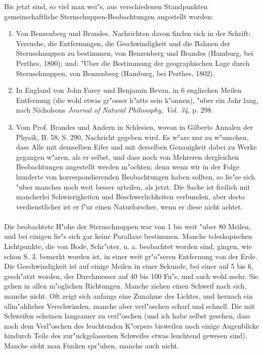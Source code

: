 \documentclass[a4paper, 11pt, oneside, polutonikogreek, german]{article}
\begin{document}
Bis jetzt sind, so viel man wei"s, aus verschiedenen Standpunkten gemeinschaftliche Sternschuppen-Beobachtungen angestellt worden:
\begin{enumerate}
    \item Von Benzenberg und Brandes. Nachrichten davon finden sich in der Schrift: Versuche, die Entfernungen, die Geschwindigkeit und die Bahnen der Sternschnuppen zu bestimmen, von Benzenberg und Brandes (Hamburg, bei Perthes, 1800); und: "Uber die Bestimmung der geographischen Lage durch Sternschnuppen, von Benzenberg (Hamburg, bei Perthes, 1802).
    \item In England von John Farey und Benjamin Bevan, in 6 englischen Meilen Entfernung (die wohl etwas gr"osser h"atte sein k"onnen), "uber ein Jahr lang, nach Nicholsons \emph{Journal of Natural Philosophy, Vol. 34}, p. 298.
    \item Vom Prof. Brandes und Andern in Schlesien, wovon in Gilberts Annalen der Physik, B. 58, S. 290, Nachricht gegeben wird. Es w"are nur zu w"unschen, dass Alle mit demselben Eifer und mit derselben Genauigkeit dabei zu Werke gegangen w"aren, als er selbst, und dass noch von Mehreren dergleichen Beobachtungen angestellt werden m"ochten; denn wenn wir in der Folge hunderte von korrespondierenden Beobachtungen haben sollten, so lie"se sich "uber manches noch weit besser urteilen, als jetzt. Die Sache ist freilich mit mancherlei Schwierigkeiten und Beschwerlichkeiten verbunden, aber desto verdienstlicher ist er f"ur einen Naturforscher, wenn er diese nicht achtet.
\end{enumerate}
\paragraph{}
Die beobachtete H"ohe der Sternschnuppen war von 1 bis weit "uber 80 Meilen, und bei einigen lie"s sich gar keine Parallaxe bestimmen. Manche teleskopischen Lichtpunkte, die von Bode, Schr"oter, u. a. beobachtet worden sind, gingen, wie schon S. 3. bemerkt worden ist, in einer weit gr"o"seren Entfernung von der Erde. Die Geschwindigkeit ist auf einige Meilen in einer Sekunde, bei einer auf 5 bis 6, gesch"atzt worden, der Durchmesser auf 40 bis 100 Fu"s, und auch wohl mehr. Sie gehen in allen m"oglichen Richtungen. Manche ziehen einen Schweif nach sich, manche nicht. Oft zeigt sich anfangs eine Zunahme des Lichtes, und hernach ein allm"ahliches Verschwinden, manche aber verl"oschen scharf und schnell. Die mit Schweifen scheinen langsamer zu verl"oschen (und ich habe selbst gesehen, dass nach dem Verl"oschen des leuchtenden K"orpers bisweilen noch einige Augenblicke hindurch Teile des zur"uckgelassenen Schweifes etwas leuchtend gewesen sind). Manche sieht man Funken spr"uhen, manche auch nicht.
\end{document}
